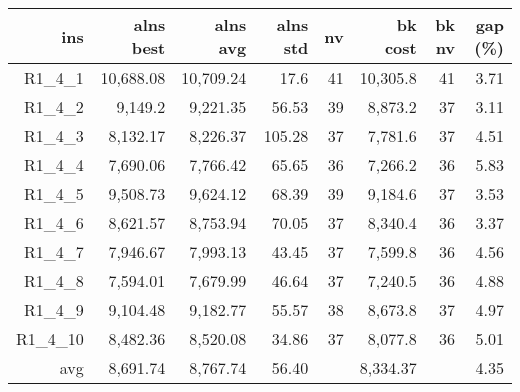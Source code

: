   \begin{table}[caption={Kết quả đo với tập HG\_R\_1\_4 400 yêu cầu}, label=exp:HGR14]
    \small
    \centering
    \begin{tabular}{rrrrrrrr}
    \hline
    ins & alns best & alns avg & alns std & nv & bk cost & bk nv & gap (\%) \\ \hline
    R1\_4\_1 & 10,688.08 & 10,709.24 & 17.6 & 41 & 10,305.8 & 41 & 3.71 \\ \hline
    R1\_4\_2 & 9,149.2 & 9,221.35 & 56.53 & 39 & 8,873.2 & 37 & 3.11 \\ \hline
    R1\_4\_3 & 8,132.17 & 8,226.37 & 105.28 & 37 & 7,781.6 & 37 & 4.51 \\ \hline
    R1\_4\_4 & 7,690.06 & 7,766.42 & 65.65 & 36 & 7,266.2 & 36 & 5.83 \\ \hline
    R1\_4\_5 & 9,508.73 & 9,624.12 & 68.39 & 39 & 9,184.6 & 37 & 3.53 \\ \hline
    R1\_4\_6 & 8,621.57 & 8,753.94 & 70.05 & 37 & 8,340.4 & 36 & 3.37 \\ \hline
    R1\_4\_7 & 7,946.67 & 7,993.13 & 43.45 & 37 & 7,599.8 & 36 & 4.56 \\ \hline
    R1\_4\_8 & 7,594.01 & 7,679.99 & 46.64 & 37 & 7,240.5 & 36 & 4.88 \\ \hline
    R1\_4\_9 & 9,104.48 & 9,182.77 & 55.57 & 38 & 8,673.8 & 37 & 4.97 \\ \hline
    R1\_4\_10 & 8,482.36 & 8,520.08 & 34.86 & 37 & 8,077.8 & 36 & 5.01 \\ \hline
    avg & 8,691.74 & 8,767.74 & 56.40 & & 8,334.37 & & 4.35 \\ \hline
    \end{tabular}
  \end{table}

